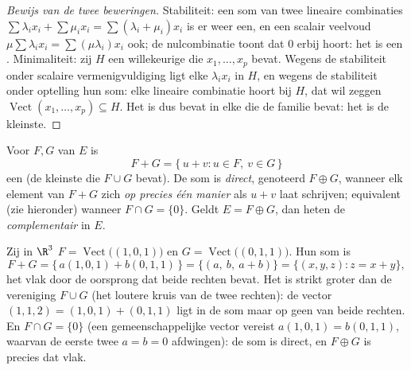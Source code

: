 \begin{proof}[Bewijs van de twee beweringen]
Stabiliteit: een som van twee lineaire combinaties $\sum\lambda_i
x_i + \sum\mu_i x_i = \sum(\lambda_i + \mu_i)x_i$ is er weer een,
en een scalair veelvoud $\mu\sum\lambda_i x_i =
\sum(\mu\lambda_i) x_i$ ook; de nulcombinatie toont dat $0$
erbij hoort: het  is een . Minimaliteit: zij
$H$ een willekeurige  die $x_1, \dots, x_p$ bevat.
Wegens de stabiliteit onder scalaire vermenigvuldiging ligt elke
$\lambda_i x_i$ in $H$, en wegens de stabiliteit onder optelling
hun som: elke lineaire combinatie hoort bij $H$, dat wil zeggen
$\operatorname{Vect}(x_1, \dots, x_p) \subseteq H$. Het 
is dus bevat in elke  die de familie bevat: het is de
kleinste.
\end{proof}

\begin{definition}\label{def:b1:vspaces:sum}
Voor  $F, G$ van $E$ is
\[
F + G = \{\,u + v : u \in F,\ v \in G\,\}
\]
een  (de kleinste die $F \cup G$ bevat). De som is
\emph{direct}, genoteerd $F \oplus G$, wanneer
elk element van $F + G$ zich \emph{op precies één manier} als $u +
v$ laat schrijven; equivalent (zie hieronder) wanneer $F \cap G =
\{0\}$. Geldt $E = F \oplus G$, dan heten de 
\emph{complementair} in $E$.
\end{definition}

\begin{example}
\label{ex:b1:vspaces:sumoflines}
Zij in $\R^3$ $F = \operatorname{Vect}\bigl((1,0,1)\bigr)$ en $G
= \operatorname{Vect}\bigl((0,1,1)\bigr)$. Hun som is
\[
F + G = \{\,a(1,0,1) + b(0,1,1)\,\}
= \{(a,\ b,\ a + b)\} = \{(x, y, z) : z = x + y\},
\]
het vlak door de oorsprong dat beide rechten bevat. Het is strikt
groter dan de vereniging $F \cup G$ (het loutere kruis van de twee
rechten): de vector $(1, 1, 2) = (1,0,1) + (0,1,1)$ ligt in de
som maar op geen van beide rechten. En $F \cap G = \{0\}$ (een
gemeenschappelijke vector vereist $a(1,0,1) = b(0,1,1)$, waarvan
de eerste twee  $a = b = 0$ afdwingen): de som is
direct, en $F \oplus G$ is precies dat vlak.
\end{example}

